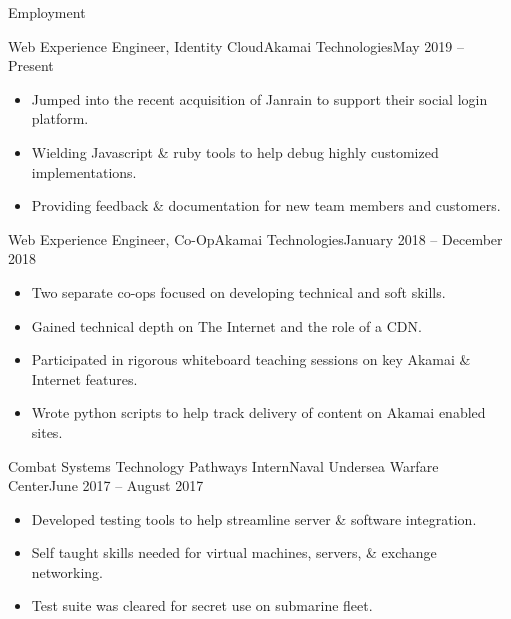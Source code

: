\documentclass[]{mcdowellcv}
\begin{document}
	\makeheader
	
	\begin{cvsection}{Employment}
		\begin{cvsubsection}{Web Experience Engineer, Identity Cloud}{Akamai Technologies}{May 2019 -- Present}
		\vspace{2mm}		
			\begin{itemize}
				\item Jumped into the recent acquisition of Janrain to support their social login platform.
				\item Wielding Javascript \& ruby tools to help debug highly customized implementations.
				\item Providing feedback \& documentation for new team members and customers.
			\end{itemize}
		\end{cvsubsection}
		
		\begin{cvsubsection}{Web Experience Engineer, Co-Op}{Akamai Technologies}{January 2018 -- December 2018}
		\vspace{2mm}
			\begin{itemize}
				\item Two separate co-ops focused on developing technical and soft skills.
				\item Gained technical depth on The Internet and the role of a CDN.
				\item Participated in rigorous whiteboard teaching sessions on key Akamai \& Internet features.
				\item Wrote python scripts to help track delivery of content on Akamai enabled sites.
			\end{itemize}
		\end{cvsubsection}
		
		\begin{cvsubsection}{Combat Systems Technology Pathways Intern}{Naval Undersea Warfare Center}{June 2017 -- August 2017}
		\vspace{2mm}
			\begin{itemize}
				\item Developed testing tools to help streamline server \& software integration.
				\item Self taught skills needed for virtual machines, servers, \& exchange networking.
				\item Test suite was cleared for secret use on submarine fleet.
			\end{itemize}
		\end{cvsubsection}
		
	\end{cvsection}
	
\end{document}
